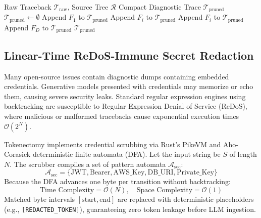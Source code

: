 \documentclass[10pt,twocolumn,letterpaper]{article}
\begin{document}
\begin{algorithm}[t]
\caption{AST Traceback Frame Pruning}
\label{alg:prune}
\begin{algorithmic}[1]
\Require Raw Traceback $\mathcal{T}_{\text{raw}}$, Source Tree $\mathcal{R}$
\Ensure Compact Diagnostic Trace $\mathcal{T}_{\text{pruned}}$
\State $\mathcal{T}_{\text{pruned}} \leftarrow \emptyset$
\State Append $F_1$ to $\mathcal{T}_{\text{pruned}}$ 
        \State Append $F_i$ to $\mathcal{T}_{\text{pruned}}$
        \State Append $F_i$ to $\mathcal{T}_{\text{pruned}}$ 
    \EndIf
\EndFor
\State Append $F_D$ to $\mathcal{T}_{\text{pruned}}$ 
\State \Return $\mathcal{T}_{\text{pruned}}$
\end{algorithmic}
\end{algorithm}

\subsection{Linear-Time ReDoS-Immune Secret Redaction}
Many open-source issues contain diagnostic dumps containing embedded credentials. Generative models presented with credentials may memorize or echo them, causing severe security leaks. Standard regular expression engines using backtracking are susceptible to Regular Expression Denial of Service (ReDoS), where malicious or malformed tracebacks cause exponential execution times $\mathcal{O}(2^N)$.

Tokenectomy implements credential scrubbing via Rust's PikeVM and Aho-Corasick deterministic finite automata (DFA). Let the input string be $S$ of length $N$. The scrubber compiles a set of pattern automata $\mathcal{A}_{\text{sec}}$:
\begin{equation}
    \mathcal{A}_{\text{sec}} = \{ \text{JWT}, \text{Bearer}, \text{AWS\_Key}, \text{DB\_URI}, \text{Private\_Key} \}
\end{equation}
Because the DFA advances one byte per transition without backtracking:
\begin{equation}
    \text{Time Complexity} = \mathcal{O}(N), \quad \text{Space Complexity} = \mathcal{O}(1)
\end{equation}
Matched byte intervals $[\text{start}, \text{end}]$ are replaced with deterministic placeholders (e.g., \texttt{[REDACTED\_TOKEN]}), guaranteeing zero token leakage before LLM ingestion.
\end{document}
